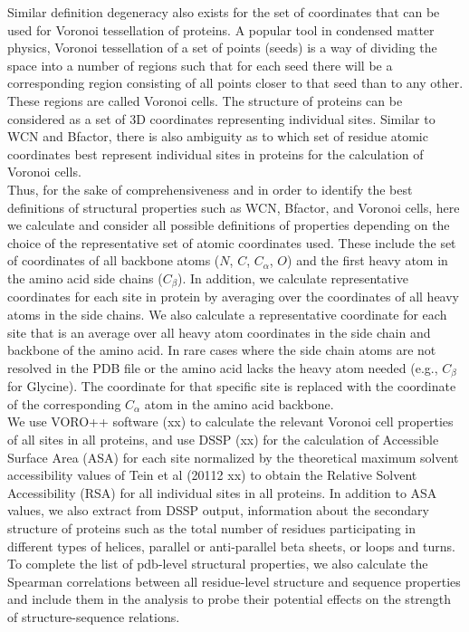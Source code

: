 \documentclass[11pt]{article}
\begin{document}
    Similar definition degeneracy also exists for the set of coordinates that can be used for Voronoi tessellation of proteins. A popular tool in condensed matter physics, Voronoi tessellation of a set of points (seeds) is a way of dividing the space into a number of regions such that for each seed there will be a corresponding region consisting of all points closer to that seed than to any other. These regions are called Voronoi cells. The structure of proteins can be considered as a set of 3D coordinates representing individual sites. Similar to WCN and Bfactor, there is also ambiguity as to which set of residue atomic coordinates best represent individual sites in proteins for the calculation of Voronoi cells.
    \\

    Thus, for the sake of comprehensiveness and in order to identify the best definitions of structural properties such as WCN, Bfactor, and Voronoi cells, here we calculate and consider all possible definitions of properties depending on the choice of the representative set of atomic coordinates used. These include the set of coordinates of all backbone atoms ($N$, $C$, $C_\alpha$, $O$) and the first heavy atom in the amino acid side chains ($C_\beta$). In addition, we calculate representative coordinates for each site in protein by averaging over the coordinates of all heavy atoms in the side chains. We also calculate a representative coordinate for each site that is an average over all heavy atom coordinates in the side chain and backbone of the amino acid. In rare cases where the side chain atoms are not resolved in the PDB file or the amino acid lacks the heavy atom needed (e.g., $C_\beta$ for Glycine). The coordinate for that specific site is replaced with the coordinate of the corresponding $C_\alpha$ atom in the amino acid backbone.
    \\

    We use VORO++ software (xx) to calculate the relevant Voronoi cell properties of all sites in all proteins, and use DSSP (xx) for the calculation of Accessible Surface Area (ASA) for each site normalized by the theoretical maximum solvent accessibility values of Tein et al (20112 xx) to obtain the Relative Solvent Accessibility (RSA) for all individual sites in all proteins. In addition to ASA values, we also extract from DSSP output, information about the secondary structure of proteins such as the total number of residues participating in different types of helices, parallel or anti-parallel beta sheets, or loops and turns. To complete the list of pdb-level structural properties, we also calculate the Spearman correlations between all residue-level structure and sequence properties and include them in the analysis to probe their potential effects on the strength of structure-sequence relations.
    \\
\end{document}
